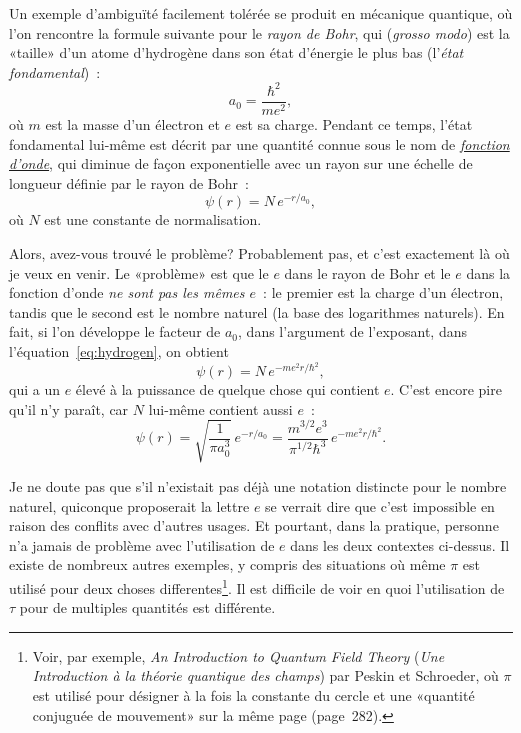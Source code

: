 Un exemple d'ambiguïté facilement tolérée se produit en mécanique quantique, où
l'on rencontre la formule suivante pour le \emph{rayon de Bohr}, qui (\emph{grosso
modo}) est la «\ns taille\ns » d'un atome d'hydrogène dans son état d'énergie le
plus bas (l'\emph{état fondamental})~:
\[
a_0 = \frac{\hbar^2}{m e^2},
\]
où $m$ est la masse d'un électron et $e$ est sa charge. Pendant ce temps, l'état
fondamental lui-même est décrit par une quantité connue sous le nom de
\href{https://fr.wikipedia.org/wiki/Fonction_d%27onde}{\emph{fonction d'onde}},
qui diminue de façon exponentielle avec un rayon sur une échelle de longueur
définie par le rayon de Bohr~:
\begin{equation}
\label{eq:hydrogen}
\psi(r) = N\,e^{-r/a_0},
\end{equation}
où $N$ est une constante de normalisation.

Alors, avez-vous trouvé le problème\ns? Probablement pas, et c'est exactement là où je veux en
venir. Le «\ns problème\ns » est que le $e$ dans le rayon de Bohr et le $e$ dans la
fonction d'onde \emph{ne sont pas les mêmes $e$}~: le premier est la charge
d'un électron, tandis que le second est le nombre naturel (la base des logarithmes
naturels). En fait, si l'on développe le facteur de $a_0$, dans l'argument de
l'exposant, dans l'équation~\eqref{eq:hydrogen}, on obtient
\[
\psi(r) = N\,e^{-m e^2 r/\hbar^2},
\]
qui a un $e$ élevé à la puissance de quelque chose qui contient $e$. C'est
encore pire qu'il n'y paraît, car $N$ lui-même contient aussi $e$~:
\[
\psi(r) = \sqrt{\frac{1}{\pi a_0^3}}\,e^{-r/a_0} =
\frac{m^{3/2} e^3}{\pi^{1/2} \hbar^3}\,e^{-m e^2 r/\hbar^2}.
\]

Je ne doute pas que s'il n'existait pas déjà une notation distincte pour le
nombre naturel, quiconque proposerait la lettre $e$ se verrait dire que
c'est impossible en raison des conflits avec d'autres usages. Et pourtant,
dans la pratique, personne n'a jamais de problème avec l'utilisation de $e$ dans
les deux contextes ci-dessus. Il existe de nombreux autres exemples, y compris
des situations où même $\pi$ est utilisé pour deux choses
differentes\ns\footnote{Voir, par exemple, \emph{An Introduction to Quantum Field
Theory} (\emph{Une Introduction à la théorie quantique des champs}) par Peskin
et Schroeder, où $\pi$ est utilisé pour désigner à la fois la constante du
cercle et une «\ns quantité conjuguée de mouvement\ns » sur la même page
(page~282).}. Il est difficile de voir en quoi l'utilisation de $\tau$ pour
de multiples quantités est différente.

